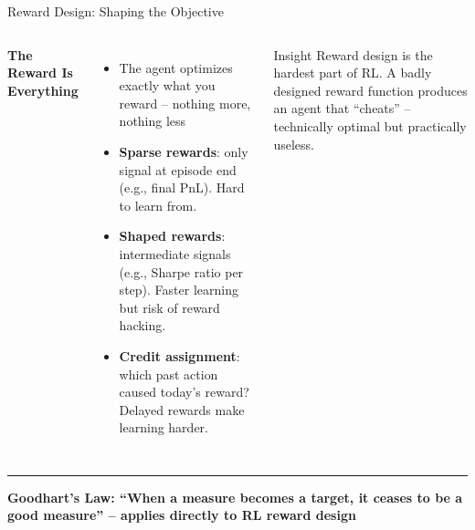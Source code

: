 \documentclass[8pt,aspectratio=169]{beamer}
\newcommand{\bottomnote}[1]{%
\vfill
\vspace{-2mm}
\textcolor{mllavender2}{\rule{\textwidth}{0.4pt}}
\vspace{1mm}
\footnotesize
\textbf{#1}
}
\newenvironment{compactlist}{%
  \begin{itemize}%
    \setlength{\itemsep}{2pt}%
    \setlength{\parskip}{0pt}%
    \setlength{\parsep}{0pt}%
}{%
  \end{itemize}%
}
\newcommand{\highlight}[1]{\textcolor{mlorange}{\textbf{#1}}}
\begin{document}
\begin{frame}[t]{Reward Design: Shaping the Objective}
\begin{columns}[T]
\small
\textbf{The Reward Is Everything}
\begin{compactlist}
\item The agent optimizes exactly what you reward -- nothing more, nothing less
\item \highlight{Sparse rewards}: only signal at episode end (e.g., final PnL). Hard to learn from.
\item \highlight{Shaped rewards}: intermediate signals (e.g., Sharpe ratio per step). Faster learning but risk of reward hacking.
\item \highlight{Credit assignment}: which past action caused today's reward? Delayed rewards make learning harder.
\end{compactlist}

\begin{block}{Insight}
\scriptsize Reward design is the hardest part of RL. A badly designed reward function produces an agent that ``cheats'' -- technically optimal but practically useless.
\end{block}

\vspace{2mm}
\footnotesize
{}
\end{columns}

\bottomnote{Goodhart's Law: ``When a measure becomes a target, it ceases to be a good measure'' -- applies directly to RL reward design}
\end{frame}
\end{document}
